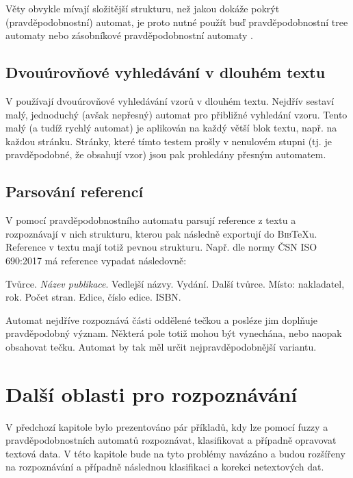 \documentclass[a4paper,10pt]{article}
\begin{document}
Věty obvykle mívají složitější strukturu, než jakou dokáže pokrýt  (pravděpodobnostní) automat, je proto nutné použít buď pravděpodobnostní tree automaty \cite{KniGra-OvProTreTraNatLanPro} nebo zásobníkové pravděpodobnostní automaty \cite{WaMan-ProFiStMaRegBaMTEva}.

\subsection{Dvouúrovňové vyhledávání v dlouhém textu}

V \cite{Hun-NoLiTexSeaUsFuFiStLiNoDetAut} používají dvouúrovňové vyhledávání vzorů v dlouhém textu. Nejdřív sestaví malý, jednoduchý (avšak nepřesný) automat pro přibližné vyhledání vzoru. Tento malý (a tudíž rychlý automat) je aplikován na každý větší blok textu, např. na každou stránku. Stránky, které tímto testem prošly v nenulovém stupni (tj. je pravděpodobné, že obsahují vzor) jsou pak prohledány přesným automatem.

\subsection{Parsování referencí}
V \cite{Kra+-BibMeExUsiPrFiStTra} pomocí pravděpodobnostního automatu parsují reference z textu a rozpoznávají v nich strukturu, kterou pak následně exportují do \textsc{Bib}\TeX u. Reference v textu mají totiž pevnou strukturu. Např. dle normy ČSN ISO 690:2017\cite{web-CesCitNorm} má reference vypadat následovně:

Tvůrce. \textit{Název publikace}. Vedlejší názvy. Vydání. Další tvůrce. Místo: nakladatel, rok. Počet stran. Edice, číslo edice. ISBN.

Automat nejdříve rozpoznává části oddělené tečkou a posléze jim doplňuje pravděpodobný význam. Některá pole totiž mohou být vynechána, nebo naopak obsahovat tečku. Automat by tak měl určit nejpravděpodobnější variantu.

\section{Další oblasti pro rozpoznávání}
V předchozí kapitole bylo prezentováno pár příkladů, kdy lze pomocí fuzzy a pravděpodobnostních automatů rozpoznávat, klasifikovat a případně opravovat textová data. V této kapitole bude na tyto problémy navázáno a budou rozšířeny na rozpoznávání a případně následnou klasifikaci a korekci netextových dat.
\end{document}
